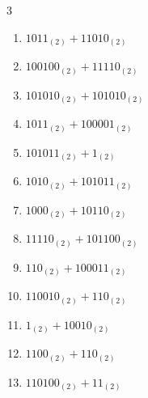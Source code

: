 \begin{multicols}{3}
\begin{enumerate}

  \item $1011_{(2)} + 11010_{(2)}$


  \item $100100_{(2)} + 11110_{(2)}$


  \item $101010_{(2)} + 101010_{(2)}$


\columnbreak %

  \item $1011_{(2)} + 100001_{(2)}$


  \item $101011_{(2)} + 1_{(2)}$


  \item $1010_{(2)} + 101011_{(2)}$


  \item $1000_{(2)} + 10110_{(2)}$


  \item $11110_{(2)} + 101100_{(2)}$


  \item $110_{(2)} + 100011_{(2)}$


  \item $110010_{(2)} + 110_{(2)}$


  \item $1_{(2)} + 10010_{(2)}$


  \item $1100_{(2)} + 110_{(2)}$


  \item $110100_{(2)} + 11_{(2)}$



\end{enumerate}
\end{multicols}

